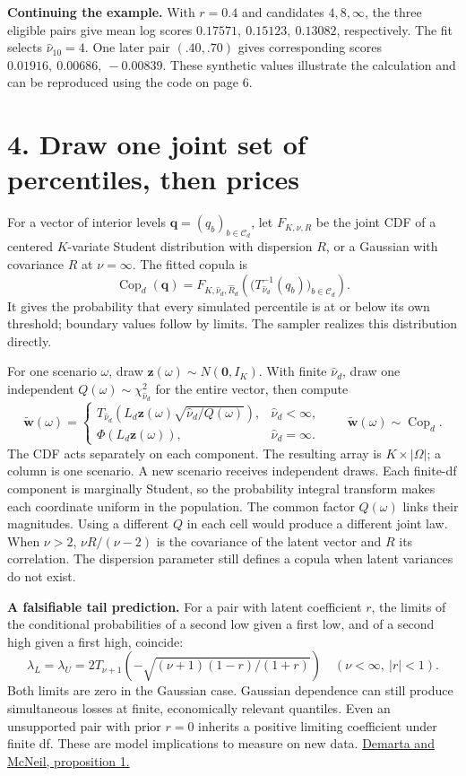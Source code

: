 \documentclass[11pt,letterpaper]{article}
\newcommand{\sect}[1]{\section*{\color{ink}#1}}
\newcommand{\lead}[1]{\textbf{\textcolor{accent}{#1}}}
\newcommand{\Cop}{\operatorname{Cop}}
\newcommand{\ord}{\mathcal C_d}
\newcommand{\src}[2]{\href{#1}{#2}}
\begin{document}
\lead{Continuing the example.} With \(r=0.4\) and candidates \(4,8,\infty\), the three eligible pairs give mean log scores \(0.17571,\ 0.15123,\ 0.13082\), respectively. The fit selects \(\widehat\nu_{10}=4\). One later pair \((.40,.70)\) gives corresponding scores \(0.01916,\ 0.00686,\ -0.00839\). These synthetic values illustrate the calculation and can be reproduced using the code on page 6.

\newpage
\sect{4. Draw one joint set of percentiles, then prices}
For a vector of interior levels \(\mathbf q=(q_b)_{b\in\ord}\), let \(F_{K,\nu,R}\) be the joint CDF of a centered \(K\)-variate Student distribution with dispersion \(R\), or a Gaussian with covariance \(R\) at \(\nu=\infty\). The fitted copula is
\[
 \Cop_d(\mathbf q)=F_{K,\widehat\nu_d,\widehat R_d}
 \!\left(\bigl(T_{\widehat\nu_d}^{-1}(q_b)\bigr)_{b\in\ord}\right).
\]
It gives the probability that every simulated percentile is at or below its own threshold; boundary values follow by limits. The sampler realizes this distribution directly.

For one scenario \(\omega\), draw \(\mathbf z(\omega)\sim N(\mathbf 0,I_K)\). With finite \(\widehat\nu_d\), draw one independent \(Q(\omega)\sim\chi^2_{\widehat\nu_d}\) for the entire vector, then compute
\[
 \tilde{\mathbf w}(\omega)=
 \begin{cases}
 T_{\widehat\nu_d}\!\left(
 L_d\mathbf z(\omega)\sqrt{\widehat\nu_d/Q(\omega)}\right),
 &\widehat\nu_d<\infty,\\
 \Phi\!\left(L_d\mathbf z(\omega)\right),&\widehat\nu_d=\infty .
 \end{cases}
 \qquad \tilde{\mathbf w}(\omega)\sim\Cop_d .
\]
The CDF acts separately on each component. The resulting array is \(K\times|\Omega|\); a column is one scenario. A new scenario receives independent draws. Each finite-df component is marginally Student, so the probability integral transform makes each coordinate uniform in the population. The common factor \(Q(\omega)\) links their magnitudes. Using a different \(Q\) in each cell would produce a different joint law. When \(\nu>2\), \(\nu R/(\nu-2)\) is the covariance of the latent vector and \(R\) its correlation. The dispersion parameter still defines a copula when latent variances do not exist.

\lead{A falsifiable tail prediction.} For a pair with latent coefficient \(r\), the limits of the conditional probabilities of a second low given a first low, and of a second high given a first high, coincide:
\[
 \lambda_L=\lambda_U=
 2T_{\nu+1}\!\left(-\sqrt{(\nu+1)(1-r)/(1+r)}\right)
 \quad(\nu<\infty,\ |r|<1).
\]
Both limits are zero in the Gaussian case. Gaussian dependence can still produce simultaneous losses at finite, economically relevant quantiles. Even an unsupported pair with prior \(r=0\) inherits a positive limiting coefficient under finite df. These are model implications to measure on new data. \src{https://doi.org/10.1111/j.1751-5823.2005.tb00254.x}{Demarta and McNeil, proposition 1.}
\end{document}

